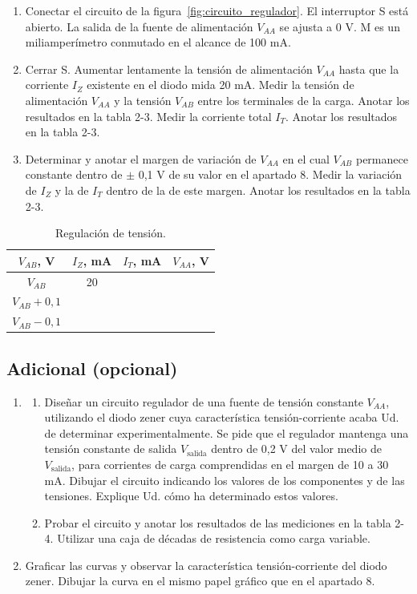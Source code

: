 \documentclass[12pt,a4paper]{article}
\begin{document}
\begin{enumerate}[resume]
    \item Conectar el circuito de la figura~\ref{fig:circuito_regulador}. El interruptor S está abierto. La salida de la fuente de alimentación $V_{AA}$ se ajusta a 0 V. M es un miliamperímetro conmutado en el alcance de 100 mA.
    \item Cerrar S. Aumentar lentamente la tensión de alimentación $V_{AA}$ hasta que la corriente $I_Z$ existente en el diodo mida 20 mA. Medir la tensión de alimentación $V_{AA}$ y la tensión $V_{AB}$ entre los terminales de la carga. Anotar los resultados en la tabla 2-3. Medir la corriente total $I_T$. Anotar los resultados en la tabla 2-3.
    \item Determinar y anotar el margen de variación de $V_{AA}$ en el cual $V_{AB}$ permanece constante dentro de $\pm$ 0,1 V de su valor en el apartado 8. Medir la variación de $I_Z$ y la de $I_T$ dentro de la de este margen. Anotar los resultados en la tabla 2-3.
\end{enumerate}

\begin{table}[H]
    \centering
    \caption{Regulación de tensión.}
    \label{tab:regulacion}
    \begin{tabular}{cccc}
        \toprule
        $V_{AB}$, V & $I_Z$, mA & $I_T$, mA & $V_{AA}$, V \\
        \midrule
        $V_{AB}$ & 20 & & \\
        $V_{AB} + 0,1$ & & & \\
        $V_{AB} - 0,1$ & & & \\
        \bottomrule
    \end{tabular}
\end{table}

\subsection*{Adicional (opcional)}
\begin{enumerate}[resume]
    \item 
    \begin{enumerate}[label=\alph*)]
        \item Diseñar un circuito regulador de una fuente de tensión constante $V_{AA}$, utilizando el diodo zener cuya característica tensión-corriente acaba Ud. de determinar experimentalmente. Se pide que el regulador mantenga una tensión constante de salida $V_{\text{salida}}$ dentro de 0,2 V del valor medio de $V_{\text{salida}}$, para corrientes de carga comprendidas en el margen de 10 a 30 mA. Dibujar el circuito indicando los valores de los componentes y de las tensiones. Explique Ud. cómo ha determinado estos valores.
        \item Probar el circuito y anotar los resultados de las mediciones en la tabla 2-4. Utilizar una caja de décadas de resistencia como carga variable.
    \end{enumerate}
    \item Graficar las curvas y observar la característica tensión-corriente del diodo zener. Dibujar la curva en el mismo papel gráfico que en el apartado 8.
\end{enumerate}
\end{document}
